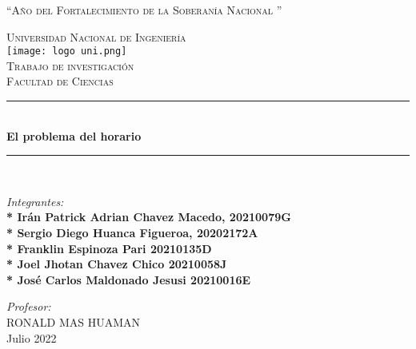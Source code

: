 \documentclass[letterpaper,12pt]{article}
\begin{document}
	
	\begin{titlepage}
		
		\newcommand{\HRule}{\rule{\linewidth}{0.5mm}} 
		
		\center 
		
		\textsc{“Año del Fortalecimiento de la Soberanía Nacional ”}
		
		\vspace{4 mm}
		
		\textsc{\LARGE Universidad Nacional de Ingeniería}\\[0.4 cm] 
		
		\texttt{[image: logo uni.png]}\\[0.006cm]
		
		\textsc{\Large Trabajo de investigación}\\[0.5cm] 
		\textsc{\large Facultad de Ciencias}\\[0.3cm]
		\HRule \\[0.3cm]
		{ \huge \bfseries El problema del horario }\\[0.2cm] 
		\HRule \\[0.05cm]
		
		\begin{flushleft} 
			\emph{Integrantes:}\\
			\vspace{3.0 mm}
			\textbf{
                \large{*  Irán Patrick Adrian Chavez Macedo, 20210079G         }}\\        
			\vspace{3.0 mm}
			\textbf{
                \large{* Sergio Diego Huanca Figueroa, 20202172A }}\\
			\vspace{3.0 mm}
			\textbf{
                \large{* Franklin Espinoza Pari 20210135D}}\\
			\vspace{3.0 mm}
			\textbf{
			    \large{* Joel Jhotan Chavez Chico 20210058J}}\\
			\vspace{3.0 mm}
			\textbf{
                \large{* José Carlos Maldonado Jesusi 20210016E}}\\
			\vspace{3.0 mm}
                
			\vspace{1 mm}
			
		\end{flushleft}
        \begin{center}
            \emph{Profesor:} \\[0.005 cm]
		        \vspace{1 mm} 
		      RONALD MAS HUAMAN \\
                    \vspace{1 cm}
                  Julio 2022
        \end{center}
        
	\end{titlepage}
    \tableofcontents
    \newpage
    
\end{document}
